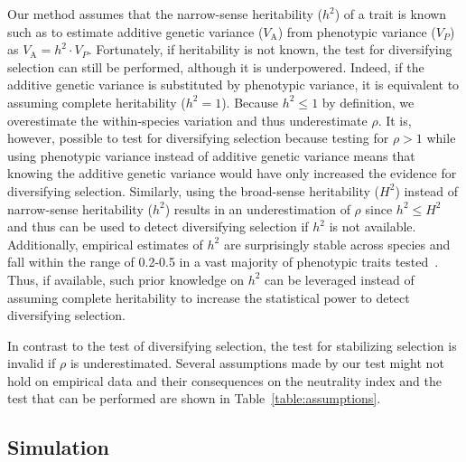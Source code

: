 \documentclass{article}
\newcommand{\Multiply}{\cdot}
\newcommand{\Trait}{P}
\newcommand{\Heritability}{h^2}
\newcommand{\VarPhenotype}{V_{\Trait}}
\newcommand{\VarGenetic}{V_{\mathrm{A}}}
\newcommand{\NI}{\rho}
\begin{document}
Our method assumes that the narrow-sense heritability ($\Heritability$) of a trait is known such as to estimate additive genetic variance ($\VarGenetic$) from phenotypic variance ($\VarPhenotype$) as $\VarGenetic = \Heritability \Multiply \VarPhenotype$.
Fortunately, if heritability is not known, the test for diversifying selection can still be performed, although it is underpowered.
Indeed, if the additive genetic variance is substituted by phenotypic variance, it is equivalent to assuming complete heritability ($\Heritability = 1$).
Because $\Heritability \leq 1$ by definition, we overestimate the within-species variation and thus underestimate $\NI$.
It is, however, possible to test for diversifying selection because testing for $\NI > 1$ while using phenotypic variance instead of additive genetic variance means that knowing the additive genetic variance would have only increased the evidence for diversifying selection.
Similarly, using the broad-sense heritability ($H^2$) instead of narrow-sense heritability ($\Heritability$) results in an underestimation of $\NI$ since $\Heritability \leq H^2$ and thus can be used to detect diversifying selection if $\Heritability$ is not available.
Additionally, empirical estimates of $\Heritability$ are surprisingly stable across species and fall within the range of 0.2-0.5 in a vast majority of phenotypic traits tested~\citep{hansen_heritability_2011, hansen_evolvability_2021}.
Thus, if available, such prior knowledge on $\Heritability$ can be leveraged instead of assuming complete heritability to increase the statistical power to detect diversifying selection.

In contrast to the test of diversifying selection, the test for stabilizing selection is invalid if $\NI$ is underestimated.
Several assumptions made by our test might not hold on empirical data and their consequences on the neutrality index and the test that can be performed are shown in Table~\ref{table:assumptions}.

\subsection*{Simulation}\label{subsec:simulations}
\end{document}
